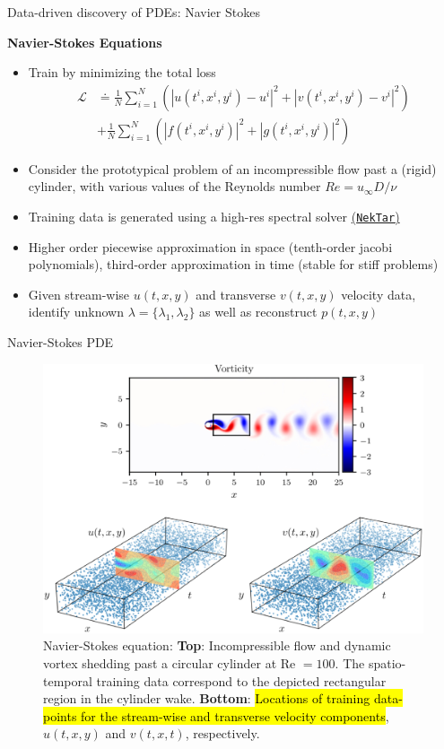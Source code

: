 \documentclass[xcolor=dvipsnames,10pt]{beamer}
\makeatletter
\let\HL\hl
\renewcommand\hl{%
  \let\set@color\beamerorig@set@color
  \let\reset@color\beamerorig@reset@color
  \HL}
\makeatother
\begin{document}
\begin{frame}[t]{Data-driven discovery of PDEs: Navier Stokes}
  
  {\bf Navier-Stokes Equations}
  \begin{itemize}
    \item<2-> Train by minimizing the total loss 
    $$
    \begin{aligned}  
      \mathcal{L}
      &\doteq
        \frac{1}{N} \sum_{i=1}^{N}\left(\left|u\left(t^{i}, x^{i}, y^{i}\right)-u^{i}\right|^{2}+\left|v\left(t^{i}, x^{i}, y^{i}\right)-v^{i}\right|^{2}\right) \\
      &+
        \frac{1}{N} \sum_{i=1}^{N}\left(\left|f\left(t^{i}, x^{i}, y^{i}\right)\right|^{2}+\left|g\left(t^{i}, x^{i}, y^{i}\right)\right|^{2}\right)
      \end{aligned}
    $$
    \item<3-> Consider the prototypical problem of an incompressible flow past a (rigid) cylinder, with various values of the Reynolds number $R e=u_{\infty} D / \nu$
    \item<4-> Training data is generated using a high-res spectral solver \href{https://www.nektar.info/}{(\texttt{NekTar})}
    \item<5-> Higher order piecewise approximation in space (tenth-order jacobi polynomials), third-order approximation in time (stable for stiff problems)
    \item<6-> Given stream-wise $u(t, x, y)$ and transverse $v(t, x, y)$ velocity data, identify unknown $\lambda = \{\lambda_1, \lambda_2\}$ as well as reconstruct $p(t, x, y)$
  \end{itemize}
\end{frame}
\begin{frame}[t]{Navier-Stokes PDE}
  \begin{figure}[H]
    \centering
    \includegraphics[width=0.65\linewidth]{vorticity.eps}
    \caption{\footnotesize\centering
      Navier-Stokes equation: \textbf{Top}: Incompressible flow and dynamic vortex shedding past a circular cylinder at Re $=100$. The spatio-temporal training data correspond to the depicted rectangular region in the cylinder wake. \textbf{Bottom}: \hl{Locations of training data-points for the stream-wise and transverse velocity components}, $u(t, x, y)$ and $v(t, x, t)$, respectively.
    }
  \end{figure}
\end{frame}
\end{document}
